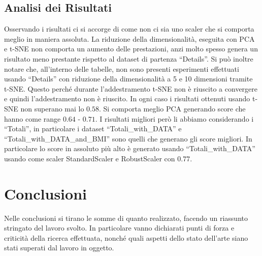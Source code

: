 \documentclass[12pt,italian]{report}
\begin{document}
\section{Analisi dei  Risultati}
Osservando i risultati ci si accorge di come non ci sia uno scaler che si comporta meglio in maniera assoluta. 
La riduzione della dimensionalità, eseguita con PCA e t-SNE non comporta un aumento delle prestazioni, anzi molto spesso genera un risultato meno prestante rispetto al dataset di partenza ``Details''. Si può inoltre notare che, all'interno delle tabelle, non sono presenti esperimenti effettuati usando ``Details'' con riduzione della dimensionalità a 5 e 10 dimensioni tramite t-SNE. Questo perché durante l'addestramento t-SNE non è riuscito a convergere e quindi l'addestramento non è riuscito.
In ogni caso i risultati ottenuti usando t-SNE non superano mai lo $0.58$. Si comporta meglio PCA generando score che hanno come range $0.64$ - $0.71$.
I risultati migliori però li abbiamo considerando i ``Totali'', in particolare i dataset ``Totali\_with\_DATA'' e ``Totali\_with\_DATA\_and\_BMI'' sono quelli che generano gli score migliori. In particolare lo score in assoluto più alto è generato usando ``Totali\_with\_DATA'' usando come scaler StandardScaler e RobustScaler con $0.77$.




% 
% 
\chapter{Conclusioni}

Nelle conclusioni si tirano le somme di quanto realizzato, facendo un riassunto stringato del lavoro svolto. In particolare vanno dichiarati punti di forza e criticità della ricerca effettuata, nonché quali aspetti dello stato dell'arte siano stati superati dal lavoro in oggetto.

%
%



\end{document}
